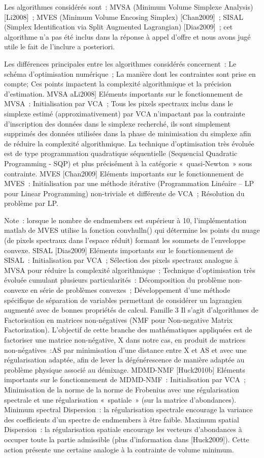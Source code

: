 Les algorithmes considérés sont :
MVSA (Minimum Volume Simplexe Analysis) [Li2008] ;
MVES (Minimum Volume Encosing Simplex) [Chan2009] ;
SISAL (Simplex Identification via Split Augmented Lagrangian) [Dias2009] ; cet algorithme n’a pas été inclus dans la réponse à appel d’offre et nous avons jugé utile le fait de l’inclure a posteriori.

Les différences principales entre les algorithmes considérés concernent :
Le schéma d’optimisation numérique ;
La manière dont les contraintes sont prise en compte;
Ces points impactent la complexité algorithmique et la précision d’estimation.
MVSA aLi2008]
Eléments importants sur le fonctionnement de MVSA :
Initialisation par VCA ;
Tous les pixels spectraux inclus dans le simplexe estimé (approximativement) par VCA n’impactant pas la contrainte d’inscription des données dans le simplexe recherché, ils sont simplement supprimés des données utilisées dans la phase de minimisation du simplexe afin de réduire la complexité algorithmique.
La technique d’optimisation très évoluée est de type programmation quadratique séquentielle (Sequencial Quadratic Programming - SQP) et plus précisément à la catégorie « quasi-Newton » sous contrainte.
MVES [Chan2009]
Eléments importants sur le fonctionnement de MVES :
Initialisation par une méthode itérative (Programmation Linéaire – LP pour Linear Programming) non-triviale et différente de VCA ;
Résolution du problème par LP.

Note : lorsque le nombre de endmembers est supérieur à 10, l’implémentation matlab de MVES utilise la fonction convhulln() qui détermine les points du nuage (de pixels spectraux dans l’espace réduit) formant les sommets de l’enveloppe convexe.
SISAL [Dias2009]
Eléments importants sur le fonctionnement de SISAL :
Initialisation par VCA ;
Sélection des pixels spectraux analogue à MVSA pour réduire la complexité algorithmique ;
Technique d’optimisation très évoluée cumulant plusieurs particularités :
Décomposition du problème non-convexe en série de problèmes convexes ;
Développement d’une méthode spécifique de séparation de variables permettant de considérer un lagrangien augmenté avec de bonnes propriétés de calcul.
Famille 3
Il s’agit d’algorithmes de Factorisation en matrices non-négatives (NMF pour Non-negative Matrix Factorization). L’objectif de cette branche des mathématiques appliquées est de factoriser une matrice non-négative, X dans notre cas, en produit de matrices non-négatives :AS par minimisation d’une distance entre X et AS et avec une régularisation adaptée, afin de lever la dégénérescence de manière adaptée au problème physique associé au démixage.
MDMD-NMF [Huck2010b]
Eléments importants sur le fonctionnement de MDMD-NMF :
Initialisation par VCA ;
Minimisation de la norme de la norme de Frobenius avec une régularisation spectrale et une régularisation « spatiale » (sur la matrice d’abondances).
Minimum spectral Dispersion : la régularisation spectrale encourage la variance des coefficients d’un spectre de endmembers à être faible.
Maximum spatial Dispersion : la régularisation spatiale encourage les vecteurs d’abondances à occuper toute la partie admissible (plus d’information dans [Huck2009]). Cette action présente une certaine analogie à la contrainte de volume minimum.

